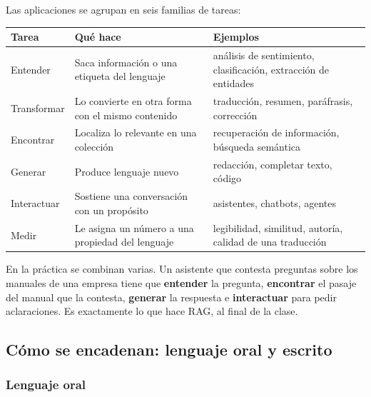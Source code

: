 \documentclass[11pt,letterpaper]{article}
\begin{document}
Las aplicaciones se agrupan en seis familias de tareas:

\begin{center}
\small
\begin{tabular}{l>{\raggedright\arraybackslash}p{5.2cm}%
                 >{\raggedright\arraybackslash}p{5.8cm}}
    \toprule
    \textbf{Tarea} & \textbf{Qué hace} & \textbf{Ejemplos} \\
    \midrule
    Entender & Saca información o una etiqueta del lenguaje
             & análisis de sentimiento, clasificación, extracción de
               entidades \\
    \addlinespace
    Transformar & Lo convierte en otra forma con el mismo contenido
                & traducción, resumen, paráfrasis, corrección \\
    \addlinespace
    Encontrar & Localiza lo relevante en una colección
              & recuperación de información, búsqueda semántica \\
    \addlinespace
    Generar & Produce lenguaje nuevo
            & redacción, completar texto, código \\
    \addlinespace
    Interactuar & Sostiene una conversación con un propósito
                & asistentes, chatbots, agentes \\
    \addlinespace
    Medir & Le asigna un número a una propiedad del lenguaje
          & legibilidad, similitud, autoría, calidad de una
            traducción \\
    \bottomrule
\end{tabular}
\end{center}

En la práctica se combinan varias. Un asistente que contesta preguntas
sobre los manuales de una empresa tiene que \textbf{entender} la
pregunta, \textbf{encontrar} el pasaje del manual que la contesta,
\textbf{generar} la respuesta e \textbf{interactuar} para pedir
aclaraciones. Es exactamente lo que hace RAG, al final de la clase.


\subsection*{Cómo se encadenan: lenguaje oral y escrito}

\subsubsection*{Lenguaje oral}
\end{document}
